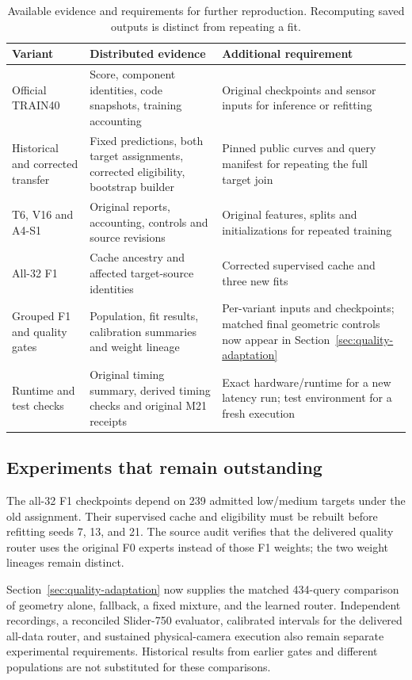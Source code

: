 \begin{table}[H]
\centering\small
\caption{Available evidence and requirements for further reproduction. Recomputing saved outputs is distinct from repeating a fit.}
\label{tab:audit-availability}
\begin{tabularx}{\linewidth}{@{}p{.20\linewidth}XX@{}}
\toprule
Variant & Distributed evidence & Additional requirement \\\midrule
Official TRAIN40 & Score, component identities, code snapshots, training accounting & Original checkpoints and sensor inputs for inference or refitting \\
Historical and corrected transfer & Fixed predictions, both target assignments, corrected eligibility, bootstrap builder & Pinned public curves and query manifest for repeating the full target join \\
T6, V16 and A4-S1 & Original reports, accounting, controls and source revisions & Original features, splits and initializations for repeated training \\
All-32 F1 & Cache ancestry and affected target-source identities & Corrected supervised cache and three new fits \\
Grouped F1 and quality gates & Population, fit results, calibration summaries and weight lineage & Per-variant inputs and checkpoints; matched final geometric controls now appear in Section~\ref{sec:quality-adaptation} \\
Runtime and test checks & Original timing summary, derived timing checks and original M21 receipts & Exact hardware/runtime for a new latency run; test environment for a fresh execution \\
\bottomrule
\end{tabularx}
\end{table}

\subsection{Experiments that remain outstanding}
The all-32 F1 checkpoints depend on 239 admitted low/medium targets under the old assignment. Their supervised cache and eligibility must be rebuilt before refitting seeds 7, 13, and 21. The source audit verifies that the delivered quality router uses the original F0 experts instead of those F1 weights; the two weight lineages remain distinct. 

Section~\ref{sec:quality-adaptation} now supplies the matched 434-query comparison of geometry alone, fallback, a fixed mixture, and the learned router. Independent recordings, a reconciled Slider-750 evaluator, calibrated intervals for the delivered all-data router, and sustained physical-camera execution also remain separate experimental requirements. Historical results from earlier gates and different populations are not substituted for these comparisons. 
